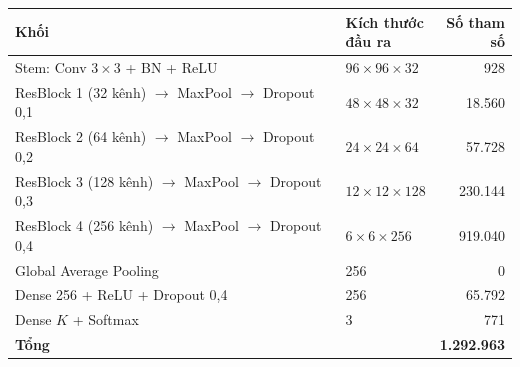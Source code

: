 \begin{tabular}{llr}
\toprule
Khối & \makecell[l]{Kích thước\\đầu ra} & \makecell[r]{Số tham\\số} \\
\midrule
Stem: Conv $3{\times}3$ + BN + ReLU & $96\times96\times32$ & 928 \\
ResBlock 1 (32 kênh) $\to$ MaxPool $\to$ Dropout 0{,}1 & $48\times48\times32$ & 18{.}560 \\
ResBlock 2 (64 kênh) $\to$ MaxPool $\to$ Dropout 0{,}2 & $24\times24\times64$ & 57{.}728 \\
ResBlock 3 (128 kênh) $\to$ MaxPool $\to$ Dropout 0{,}3 & $12\times12\times128$ & 230{.}144 \\
ResBlock 4 (256 kênh) $\to$ MaxPool $\to$ Dropout 0{,}4 & $6\times6\times256$ & 919{.}040 \\
Global Average Pooling & 256 & 0 \\
Dense 256 + ReLU + Dropout 0,4 & 256 & 65{.}792 \\
Dense $K$ + Softmax & 3 & 771 \\
\midrule
\textbf{Tổng} &  & \textbf{1{.}292{.}963} \\
\bottomrule
\end{tabular}
